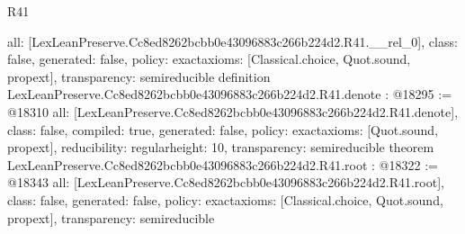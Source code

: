 \begin{lexlean}{R41}
\begin{coremodule}
{  all: [LexLeanPreserve.Cc8ed8262bcbb0e43096883c266b224d2.R41.__rel_0],
  class: false,
  generated: false,
  policy: exact{axioms: [Classical.choice, Quot.sound, propext]},
  transparency: semireducible
}
definition LexLeanPreserve.Cc8ed8262bcbb0e43096883c266b224d2.R41.denote : @18295 := @18310 {
  all: [LexLeanPreserve.Cc8ed8262bcbb0e43096883c266b224d2.R41.denote],
  class: false,
  compiled: true,
  generated: false,
  policy: exact{axioms: [Quot.sound, propext]},
  reducibility: regular{height: 10},
  transparency: semireducible
}
theorem LexLeanPreserve.Cc8ed8262bcbb0e43096883c266b224d2.R41.root : @18322 := @18343 {
  all: [LexLeanPreserve.Cc8ed8262bcbb0e43096883c266b224d2.R41.root],
  class: false,
  generated: false,
  policy: exact{axioms: [Classical.choice, Quot.sound, propext]},
  transparency: semireducible
}


\end{coremodule}
\end{lexlean}

